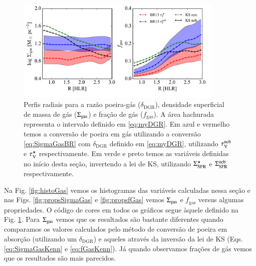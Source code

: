 \begin{figure}
	\centering
	\includegraphics[width=0.9\textwidth]{figuras/gas_R.pdf}
	\caption[Perfis radiais de $\SigmaGas$ e $f_{\mathrm{gas}}$.]
	{Perfis radiais para a razão poeira-gás ($\delta_{\mathrm{DGR}}$), densidade superficial de massa
de gás ($\SigmaGas$) e fração de gás ($f_{\mathrm{gas}}$). A área hachurada representa o intervalo
definido em \eqref{eq:myDGR}. Em azul e vermelho temos a conversão de poeira em gás utilizando a
conversão \eqref{eq:SigmaGasBR} com $\delta_{\mathrm{DGR}}$ definido em \eqref{eq:myDGR},
utilizando $\tau_{\mathrm{V}}^{\mathrm{neb}}$ e $\tau_{\mathrm{V}}^\star$ respectivamente. Em verde e preto temos as variáveis definidas no
início desta seção, invertendo a lei de KS, utilizando $\Sigma_{\mathrm{SFR}}^\star$ e $\Sigma_{\mathrm{SFR}}^{\mathrm{neb}}$ respectivamente.}
	\label{fig:propsGasR}
\end{figure}

Na Fig. \ref{fig:histoGas} vemos os histogramas das variáveis calculadas nessa seção e nas Figs.
\ref{fig:propsSigmaGas} e \ref{fig:propsfGas} vemos $\SigmaGas$ e $f_{\mathrm{gas}}$ versus algumas
propriedades. O código de cores em todos os gráficos segue àquele definido na Fig.
\ref{fig:propsGasR}. Para $\SigmaGas$ vemos que os resultados são bastante diferentes quando
comparamos os valores calculados pelo método de conversão de poeira em absorção (utilizando um
$\delta_{\mathrm{DGR}}$) e aqueles através da inversão da lei de KS (Eqs. \ref{eq:SigmaGasKenn} e
\ref{eq:fGasKenn}). Já quando observamos frações de gás vemos que os resultados são mais
parecidos.

